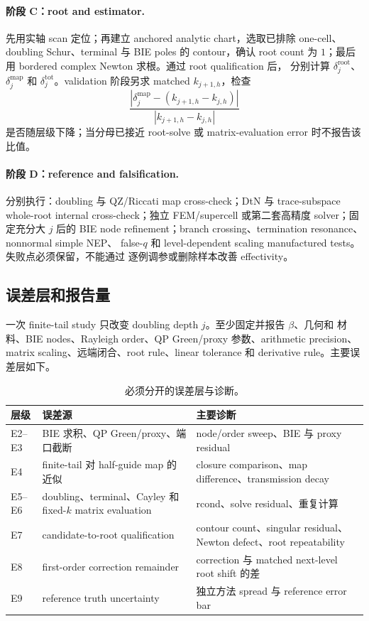 \documentclass[UTF8,fontset=fandol,11pt,a4paper]{ctexart}
\begin{document}
\paragraph{阶段 C：root and estimator.}
先用实轴 scan 定位；再建立 anchored analytic chart，选取已排除 one-cell、doubling
Schur、terminal 与 BIE poles 的 contour，确认
root count 为 $1$；最后用 bordered complex Newton 求根。通过 root qualification 后，
分别计算 $\delta_j^{\mathrm{root}}$、$\delta_j^{\mathrm{map}}$ 和
$\delta_j^{\mathrm{tot}}$。validation 阶段另求 matched $k_{j+1,h}$，检查
\[
  \frac{|\delta_j^{\mathrm{map}}-(k_{j+1,h}-k_{j,h})|}
       {|k_{j+1,h}-k_{j,h}|}
\]
是否随层级下降；当分母已接近 root-solve 或 matrix-evaluation error 时不报告该比值。

\paragraph{阶段 D：reference and falsification.}
分别执行：doubling 与 QZ/Riccati map cross-check；DtN 与 trace-subspace whole-root
internal cross-check；独立 FEM/supercell 或第二套高精度 solver；固定充分大 $j$ 后的
BIE node refinement；branch crossing、termination resonance、nonnormal simple NEP、
false-$q$ 和 level-dependent scaling manufactured tests。失败点必须保留，不能通过
逐例调参或删除样本改善 effectivity。

\subsection{误差层和报告量}

一次 finite-tail study 只改变 doubling depth $j$。至少固定并报告 $\beta$、几何和
材料、BIE nodes、Rayleigh order、QP Green/proxy 参数、arithmetic precision、matrix
scaling、远端闭合、root rule、linear tolerance 和 derivative rule。主要误差层如下。

\begin{table}[htbp]
  \centering
  \caption{必须分开的误差层与诊断。}
  \begin{tabular}{p{}p{}p{}}
    \toprule
    层级 & 误差源 & 主要诊断 \\
    \midrule
    E2--E3 & BIE 求积、QP Green/proxy、端口截断 & node/order sweep、BIE 与 proxy residual \\
    E4 & finite-tail 对 half-guide map 的近似 & closure comparison、map difference、transmission decay \\
    E5--E6 & doubling、terminal、Cayley 和 fixed-$k$ matrix evaluation & rcond、solve residual、重复计算 \\
    E7 & candidate-to-root qualification & contour count、singular residual、Newton defect、root repeatability \\
    E8 & first-order correction remainder & correction 与 matched next-level root shift 的差 \\
    E9 & reference truth uncertainty & 独立方法 spread 与 reference error bar \\
    \bottomrule
  \end{tabular}
\end{table}
\end{document}
